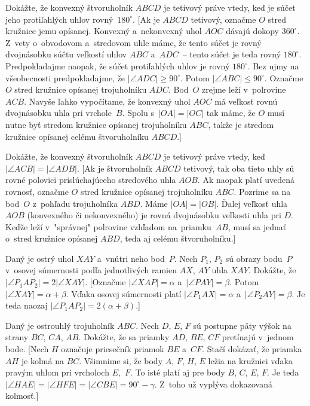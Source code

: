 {Dokážte, že konvexný štvoruholník $ABCD$ je tetivový
práve vtedy, keď je súčet jeho protiľahlých uhlov rovný~$180^\circ$.
[Ak je $ABCD$ tetivový, označme $O$ stred kružnice jemu
opísanej. Konvexný a~nekonvexný uhol $AOC$ dávajú dokopy
$360^\circ$. Z~vety o~obvodovom a~stredovom uhle máme, že tento súčet je
rovný dvojnásobku súčtu veľkostí uhlov $ABC$ a~$ADC$~--
tento súčet je teda rovný $180^\circ$. Predpokladajme
naopak, že súčet protiľahlých uhlov je rovný $180^\circ$.
Bez ujmy na všeobecnosti predpokladajme, že $|\angle
ADC| \ge 90^\circ$. Potom $|\angle ABC| \leq 90^\circ$. Označme $O$
stred kružnice opísanej trojuholníku $ADC$. Bod~$O$ zrejme leží
v~polrovine $ACB$. Navyše ľahko vypočítame, že konvexný uhol $AOC$
má veľkosť rovnú dvojnásobku uhla pri vrchole~$B$. Spolu
s~$|OA| = |OC|$ tak máme, že $O$ musí nutne byť stredom kružnice opísanej
trojuholníku $ABC$, takže je stredom kružnice opísanej celému
štvoruholníku $ABCD$.]

Dokážte, že konvexný štvoruholník $ABCD$ je tetivový
práve vtedy, keď $|\angle ACB| = |\angle ADB|$.
[Ak je štvoruholník $ABCD$ tetivový, tak oba tieto uhly sú rovné
polovici prislúchajúceho stredového uhla $AOB$. Ak naopak platí
uvedená rovnosť, označme $O$ stred kružnice opísanej
trojuholníku $ABC$. Pozrime sa na bod~$O$ z~pohľadu trojuholníka
$ABD$. Máme $|OA| = |OB|$. Ďalej veľkosť uhla $AOB$ (konvexného
či nekonvexného) je rovná dvojnásobku veľkosti uhla pri $D$.
Keďže leží v~"správnej" polrovine vzhľadom na~priamku~$AB$,
musí sa jednať o~stred kružnice opísanej $ABD$, teda aj celému
štvoruholníku.]

Daný je ostrý uhol $XAY$ a~vnútri neho bod~$P$. Nech
$P_1$, $P_2$ sú obrazy bodu~$P$ v~osovej súmernosti podľa jednotlivých
ramien $AX$, $AY$ uhla $XAY$. Dokážte, že $|\angle P_1AP_2| = 2|\angle
XAY|$. [Označme $|\angle XAP| = \alpha$ a~$|\angle PAY| = \beta$. Potom
$|\angle XAY| = \alpha+\beta$. Vďaka osovej súmernosti platí $|\angle
P_1AX| = \alpha$ a~$|\angle P_2AY| = \beta$. Je teda naozaj $|\angle
P_1AP_2| = 2(\alpha+\beta)$.]

\D
Daný je ostrouhlý trojuholník $ABC$. Nech $D$, $E$, $F$ sú postupne
päty výšok na strany $BC$, $CA$, $AB$. Dokážte, že sa priamky $AD$, $BE$, $CF$
pretínajú v~jednom bode. [Nech $H$ označuje priesečník priamok $BE$
a~$CF$. Stačí dokázať, že priamka~$AH$ je kolmá na $BC$. Všimnime
si, že body $A$, $F$, $H$, $E$ ležia na kružnici vďaka pravým uhlom pri
vrcholoch $E$,~$F$. To isté platí aj pre body $B$, $C$, $E$, $F$. Je teda
$|\angle HAE| = |\angle HFE| = |\angle CBE| = 90^\circ-\gamma$. Z~toho už vyplýva
dokazovaná kolmosť.]

}
